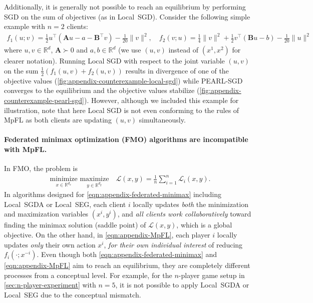 \documentclass{article}
\newcommand{\algname}[1]{{\color{PineGreen}\sf  #1}\xspace}
\newcommand{\cL}{{\mathcal{L}}}
\newcommand{\reals}{\mathbb{R}}
\newcommand{\abbvname}{\algname{PEARL-SGD}}
\theoremstyle{plain}
\theoremstyle{remark}
\begin{document}
Additionally, it is generally not possible to reach an equilibrium by performing SGD on the sum of objectives (as in Local~SGD).
Consider the following simple example with $n=2$ clients:
\begin{align}
\label{eqn:appendix-simple-counterexample}
    f_1(u;v) = \frac{1}{2} u^\intercal (\mathbf{A}u - a - \mathbf{B}^\intercal v) - \frac{1}{20} \|v\|^2, \quad f_2(v;u) = \frac{1}{4} \|v\|^2 + \frac{1}{2} v^\intercal (\mathbf{B}u - b) - \frac{1}{20} \|u\|^2 
\end{align}
where $u,v \in \reals^d$, $\mathbf{A} \succ 0$ and $a,b \in \reals^d$ (we use $(u,v)$ instead of $(x^1,x^2)$ for clearer notation).
Running Local SGD with respect to the joint variable $(u,v)$ on the sum $\frac{1}{2}(f_1(u,v) + f_2(u,v))$ results in divergence of one of the objective values (\cref{fig:appendix-counterexample-local-sgd}) while \abbvname converges to the equilibrium and the objective values stabilize (\cref{fig:appendix-counterexample-pearl-sgd}).
However, although we included this example for illustration, note that here Local SGD is not even conforming to the rules of MpFL as both clients are updating $(u,v)$ simultaneously.

\paragraph{Federated minimax optimization (FMO) algorithms are incompatible with MpFL.}
In FMO, the problem is
\begin{align}
\label{eqn:appendix-federated-minimax}
    \underset{x\in \reals^{d_x}}{\textrm{minimize}} \,\, \underset{y\in \reals^{d_y}}{\textrm{maximize}} \quad \cL(x,y) = \frac{1}{n} \sum_{i=1}^n \cL_i (x,y) . \tag{FMO}
\end{align}
In algorithms designed for \eqref{eqn:appendix-federated-minimax} including Local~SGDA or Local~SEG, each client $i$ locally updates \emph{both} the minimization and maximization variables $(x^i, y^i)$, and \emph{all clients work collaboratively} toward finding the minimax solution (saddle point) of $\cL(x,y)$, which is a global objective.
On the other hand, in \eqref{eqn:appendix-MpFL}, each player $i$ locally updates \emph{only} their own action $x^i$, \emph{for their own individual interest} of reducing $f_i(\cdot; x^{-i})$.
Even though both \eqref{eqn:appendix-federated-minimax} and \eqref{eqn:appendix-MpFL} aim to reach an equilibrium, they are completely different processes from a conceptual level.
For example, for the $n$-player game setup in \cref{sec:n-player-experiment} with $n=5$, it is not possible to apply Local~SGDA or Local~SEG due to the conceptual mismatch.
\end{document}
